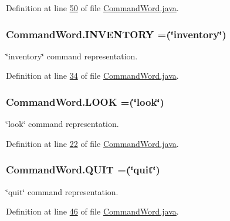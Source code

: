 Definition at line \hyperlink{CommandWord_8java_source_l00050}{50} of file \hyperlink{CommandWord_8java_source}{Command\-Word.\-java}.

\hypertarget{enumCommandWord_a624e48d45c9a1c4f614c62faa553c855}{
\subsubsection[{I\-N\-V\-E\-N\-T\-O\-R\-Y}]{\setlength{\rightskip}{0pt plus 5cm}Command\-Word.\-I\-N\-V\-E\-N\-T\-O\-R\-Y =(\char`\"{}inventory\char`\"{})}}\label{enumCommandWord_a624e48d45c9a1c4f614c62faa553c855}
\char`\"{}inventory\char`\"{} command representation. 

Definition at line \hyperlink{CommandWord_8java_source_l00034}{34} of file \hyperlink{CommandWord_8java_source}{Command\-Word.\-java}.

\hypertarget{enumCommandWord_ae56e5a1529f673fe19373fed2717cd8c}{
\subsubsection[{L\-O\-O\-K}]{\setlength{\rightskip}{0pt plus 5cm}Command\-Word.\-L\-O\-O\-K =(\char`\"{}look\char`\"{})}}\label{enumCommandWord_ae56e5a1529f673fe19373fed2717cd8c}
\char`\"{}look\char`\"{} command representation. 

Definition at line \hyperlink{CommandWord_8java_source_l00022}{22} of file \hyperlink{CommandWord_8java_source}{Command\-Word.\-java}.

\hypertarget{enumCommandWord_aa606b7593e9ff8c395e091a0f726e348}{
\subsubsection[{Q\-U\-I\-T}]{\setlength{\rightskip}{0pt plus 5cm}Command\-Word.\-Q\-U\-I\-T =(\char`\"{}quit\char`\"{})}}\label{enumCommandWord_aa606b7593e9ff8c395e091a0f726e348}
\char`\"{}quit\char`\"{} command representation. 

Definition at line \hyperlink{CommandWord_8java_source_l00046}{46} of file \hyperlink{CommandWord_8java_source}{Command\-Word.\-java}.


